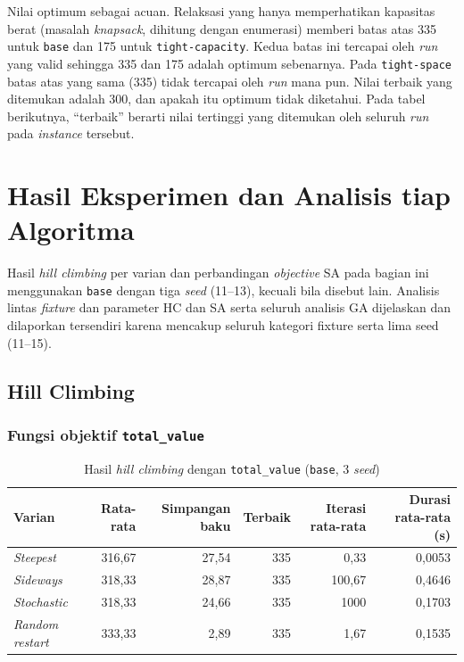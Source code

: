 Nilai optimum sebagai acuan. Relaksasi yang hanya memperhatikan kapasitas berat (masalah \textit{knapsack}, dihitung dengan enumerasi) memberi batas atas 335 untuk \texttt{base} dan 175 untuk \texttt{tight-capacity}. Kedua batas ini tercapai oleh \textit{run} yang valid sehingga 335 dan 175 adalah optimum sebenarnya. Pada \texttt{tight-space} batas atas yang sama (335) tidak tercapai oleh \textit{run} mana pun. Nilai terbaik yang ditemukan adalah 300, dan apakah itu optimum tidak diketahui. Pada tabel berikutnya, ``terbaik'' berarti nilai tertinggi yang ditemukan oleh seluruh \textit{run} pada \textit{instance} tersebut.

\section{Hasil Eksperimen dan Analisis tiap Algoritma}

Hasil \textit{hill climbing} per varian dan perbandingan \textit{objective} SA pada bagian ini menggunakan \texttt{base} dengan tiga \textit{seed} (11--13), kecuali bila disebut lain. Analisis lintas \textit{fixture} dan parameter HC dan SA serta seluruh analisis GA dijelaskan dan dilaporkan tersendiri karena mencakup seluruh kategori fixture serta lima seed (11--15).

\subsection{Hill Climbing}

\subsubsection{Fungsi objektif \texttt{total\_value}}
\begin{table}[H]
    \centering
    \begin{tabular}{@{}lrrrrr@{}}
        \toprule
        Varian                  & Rata-rata & Simpangan baku & Terbaik & Iterasi rata-rata & Durasi rata-rata (s) \\
        \midrule
        \textit{Steepest}       & 316,67    & 27,54          & 335     & 0,33              & 0,0053               \\
        \textit{Sideways}       & 318,33    & 28,87          & 335     & 100,67            & 0,4646               \\
        \textit{Stochastic}     & 318,33    & 24,66          & 335     & 1000              & 0,1703               \\
        \textit{Random restart} & 333,33    & 2,89           & 335     & 1,67              & 0,1535               \\
        \bottomrule
    \end{tabular}
    \caption{Hasil \textit{hill climbing} dengan \texttt{total\_value} (\texttt{base}, 3 \textit{seed})}
    \label{tab:hc-total}
\end{table}

